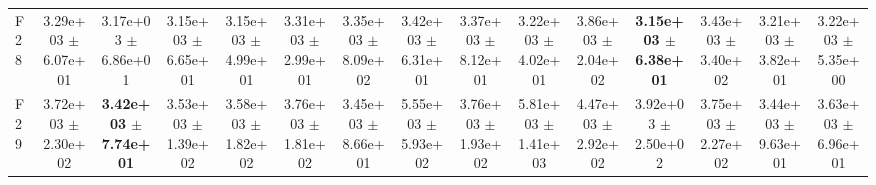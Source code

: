 \begin{table}
{\begin{tabular}{lcccccccccccccc}
F28 & 3.29e+03 $\pm$ 6.07e+01 & 3.17e+03 $\pm$ 6.86e+01 & 3.15e+03 $\pm$ 6.65e+01 & 3.15e+03 $\pm$ 4.99e+01 & 3.31e+03 $\pm$ 2.99e+01 & 3.35e+03 $\pm$ 8.09e+02 & 3.42e+03 $\pm$ 6.31e+01 & 3.37e+03 $\pm$ 8.12e+01 & 3.22e+03 $\pm$ 4.02e+01 & 3.86e+03 $\pm$ 2.04e+02 & \textbf{3.15e+03 $\pm$ 6.38e+01} & 3.43e+03 $\pm$ 3.40e+02 & 3.21e+03 $\pm$ 3.82e+01 & 3.22e+03 $\pm$ 5.35e+00 \\
F29 & 3.72e+03 $\pm$ 2.30e+02 & \textbf{3.42e+03 $\pm$ 7.74e+01} & 3.53e+03 $\pm$ 1.39e+02 & 3.58e+03 $\pm$ 1.82e+02 & 3.76e+03 $\pm$ 1.81e+02 & 3.45e+03 $\pm$ 8.66e+01 & 5.55e+03 $\pm$ 5.93e+02 & 3.76e+03 $\pm$ 1.93e+02 & 5.81e+03 $\pm$ 1.41e+03 & 4.47e+03 $\pm$ 2.92e+02 & 3.92e+03 $\pm$ 2.50e+02 & 3.75e+03 $\pm$ 2.27e+02 & 3.44e+03 $\pm$ 9.63e+01 & 3.63e+03 $\pm$ 6.96e+01 \\
\bottomrule
\end{tabular}%
}
\end{table}

